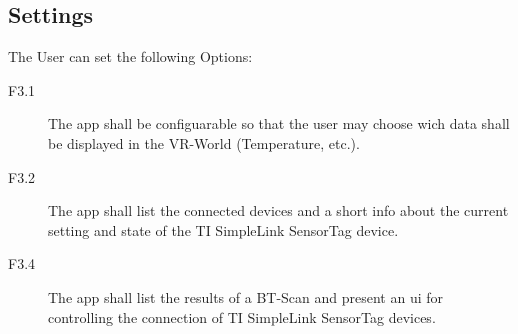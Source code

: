   \subsection{Settings}
    The User can set the following Options:

    \begin{description}
      \item[F3.1] The app shall be configuarable so that the user may choose wich data shall be displayed in the VR-World (Temperature, etc.).
      \item[F3.2] The app shall list the connected devices and a short info about the current setting and state of the TI SimpleLink SensorTag device.
      \item[F3.4] The app shall list the results of a BT-Scan and present an ui for controlling the connection of TI SimpleLink SensorTag devices.
    \end{description}
